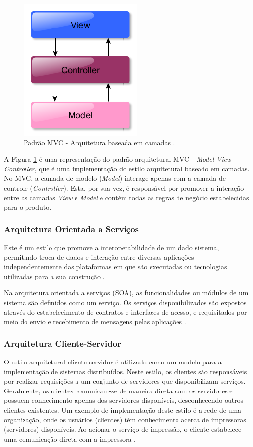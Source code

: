 \begin{figure}[htb]
\centering
\includegraphics[scale=0.5]{figuras/modelo_mvc.PNG}
\caption{Padrão MVC - Arquitetura baseada em camadas \cite{pressman2006engenharia}.}
\label{modelo_mvc}
\end{figure}

A Figura \ref{modelo_mvc} é uma representação do padrão arquitetural MVC - \textit{Model View Controller}, que é uma implementação do estilo arquitetural baseado em camadas. No MVC, a camada de modelo (\textit{Model}) interage apenas com a camada de controle (\textit{Controller}). Esta, por sua vez, é responsável por promover a interação entre as camadas \textit{View} e \textit{Model} e contém todas as regras de negócio estabelecidas para o produto.

\subsubsection{Arquitetura Orientada a Serviços}

Este é um estilo que promove a interoperabilidade de um dado sistema, permitindo troca de dados e interação entre diversas aplicações independentemente das plataformas em que são executadas ou tecnologias utilizadas para a sua construção \cite{josuttis_soa_2007}.

Na arquitetura orientada a serviços (SOA), as funcionalidades ou módulos de um sistema são definidos como um serviço. Os serviços disponibilizados são expostos através do estabelecimento de contratos e interfaces de acesso, e requisitados por meio do envio e recebimento de mensagens pelas aplicações \cite{josuttis_soa_2007}.

\subsubsection{Arquitetura Cliente-Servidor}
O estilo arquitetural cliente-servidor é utilizado como um modelo para a implementação de sistemas distribuídos. Neste estilo, os clientes são responsáveis por realizar requisições a um conjunto de servidores que disponibilizam serviços. Geralmente, os clientes comunicam-se de maneira direta com os servidores e possuem conhecimento apenas dos servidores disponíveis, desconhecendo outros clientes existentes. Um exemplo de implementação deste estilo é a rede de uma organização, onde os usuários (clientes) têm conhecimento acerca de impressoras (servidores) disponíveis. Ao acionar o serviço de impressão, o cliente estabelece uma comunicação direta com a impressora \cite{sommerville2008engenharia}.


